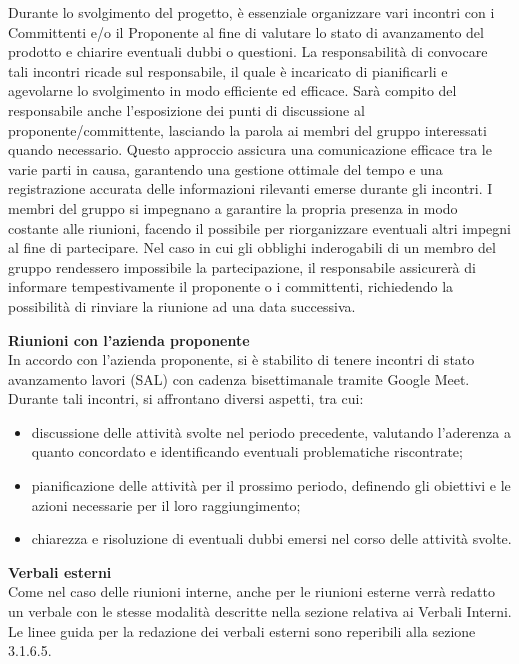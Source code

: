 Durante lo svolgimento del progetto, è essenziale organizzare vari incontri con i Committenti e/o il Proponente al fine di valutare lo stato di avanzamento del prodotto e chiarire eventuali dubbi o questioni.
La responsabilità di convocare tali incontri ricade sul responsabile, il quale è incaricato di pianificarli e agevolarne lo svolgimento in modo efficiente ed efficace.
Sarà compito del responsabile anche l’esposizione dei punti di discussione al proponente/committente, lasciando la parola ai membri del gruppo interessati quando necessario. Questo approccio assicura una comunicazione efficace tra le varie parti in causa, garantendo una gestione ottimale del tempo e una registrazione accurata delle informazioni rilevanti emerse durante gli incontri.
I membri del gruppo si impegnano a garantire la propria presenza in modo costante alle riunioni, facendo il possibile per riorganizzare eventuali altri impegni al fine di partecipare. Nel caso in cui gli obblighi inderogabili di un membro del gruppo rendessero impossibile la partecipazione, il responsabile assicurerà di informare tempestivamente il proponente o i committenti, richiedendo la possibilità di rinviare la riunione ad una data successiva.

\textbf{Riunioni con l'azienda proponente}\\
In accordo con l’azienda proponente, si è stabilito di tenere incontri di stato avanzamento lavori (SAL) con cadenza bisettimanale tramite Google Meet.
Durante tali incontri, si affrontano diversi aspetti, tra cui:
\begin{itemize}
	\item discussione delle attività svolte nel periodo precedente, valutando l’aderenza a quanto concordato e identificando eventuali problematiche riscontrate;
	\item pianificazione delle attività per il prossimo periodo, definendo gli obiettivi e le azioni necessarie per il loro raggiungimento;
	\item chiarezza e risoluzione di eventuali dubbi emersi nel corso delle attività svolte.
\end{itemize}

\textbf{Verbali esterni}\\
Come nel caso delle riunioni interne, anche per le riunioni esterne verrà redatto un verbale con le stesse modalità descritte nella sezione relativa ai Verbali Interni.
Le linee guida per la redazione dei verbali esterni sono reperibili alla sezione 3.1.6.5.


